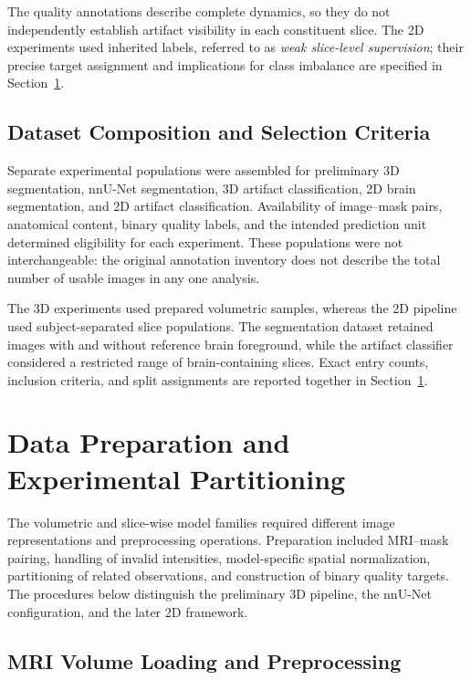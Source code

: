 The quality annotations describe complete dynamics, so they do not independently establish artifact visibility in each constituent slice. The 2D experiments used inherited labels, referred to as \emph{weak slice-level supervision}; their precise target assignment and implications for class imbalance are specified in Section~\ref{sec:data-preparation}.

\subsection{Dataset Composition and Selection Criteria}

Separate experimental populations were assembled for preliminary 3D segmentation, nnU-Net segmentation, 3D artifact classification, 2D brain segmentation, and 2D artifact classification. Availability of image--mask pairs, anatomical content, binary quality labels, and the intended prediction unit determined eligibility for each experiment. These populations were not interchangeable: the original annotation inventory does not describe the total number of usable images in any one analysis.

The 3D experiments used prepared volumetric samples, whereas the 2D pipeline used subject-separated slice populations. The segmentation dataset retained images with and without reference brain foreground, while the artifact classifier considered a restricted range of brain-containing slices. Exact entry counts, inclusion criteria, and split assignments are reported together in Section~\ref{sec:data-preparation}.

\section{Data Preparation and Experimental Partitioning}
\label{sec:data-preparation}

The volumetric and slice-wise model families required different image representations and preprocessing operations. Preparation included MRI--mask pairing, handling of invalid intensities, model-specific spatial normalization, partitioning of related observations, and construction of binary quality targets. The procedures below distinguish the preliminary 3D pipeline, the nnU-Net configuration, and the later 2D framework.

\subsection{MRI Volume Loading and Preprocessing}

